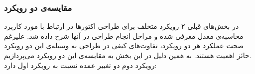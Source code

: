 \subsubsection{مقایسه‌ی دو رویکرد}
در بخش‌های قبلی ۲ رویکرد متخلف برای طراحی اکتورها در ارتباط با مورد کاربرد محاسبه‌ی معدل معرفی شده و مراحل انجام طراحی در آنها شرح داده شد. علیرغم صحت عملکرد هر دو رویکرد، تفاوت‌های کیفی در طراحی به وسیله‌ی این دو رویکرد حائز اهمیت هستند. به همین دلیل در این بخش به مقایسه‌ی این دو رویکرد می‌پردازیم.\\
رویکرد دوم دو تغییر عمده نسبت به رویکرد اول دارد:
